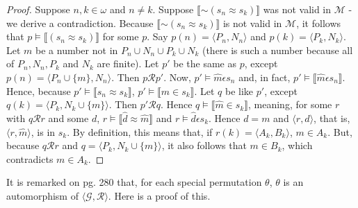 \documentclass{article}
\newcommand*{\oldneg}{\mathord{\sim}}
\newcommand{\lbc}{\llbracket}
\newcommand{\rbc}{\rrbracket}
\theoremstyle{definition}
\begin{document}
\begin{proof}
Suppose $n,k\in\omega$ and $n\ne k$. Suppose $\lbc\oldneg(s_n\approx s_k)\rbc$ was not valid in $\mathcal{M}$ - we derive a contradiction. 
Because $\lbc\oldneg(s_n\approx s_k)\rbc$ is not valid in $\mathcal{M}$, it follows that
$p\vDash\lbc(s_n\approx s_k)\rbc$ for some $p$. Say $p(n)=\langle P_n,N_n\rangle$ and 
$p(k)=\langle P_k,N_k\rangle$. Let $m$ be a number not in $P_n\cup N_n\cup P_k\cup N_k$ (there is such a number 
because all of $P_n,N_n,P_k$ and $N_k$ are finite). Let $p'$ be the same as $p$, except 
$p(n)=\langle P_n\cup\{m\},N_n\rangle$. Then $p\mathcal{R}p'$. Now, $p'\vDash\hat{m}\epsilon s_n$ and, in fact, 
$p'\vDash\lbc\hat{m}\epsilon s_n\rbc$. Hence, because $p'\vDash\lbc s_n\approx s_k\rbc$, 
$p'\vDash\lbc\hat{m}\in s_k\rbc$. Let $q$ be like $p'$, except 
$q(k)=\langle P_k,N_k\cup\{m\}\rangle$. Then $p'\mathcal{R}q$. Hence
$q\vDash\lbc\hat{m}\in s_k\rbc$, meaning, for some $r$ with $q\mathcal{R}r$ and some $d$,
$r\vDash\lbc\hat{d}\approx\hat{m}\rbc$ and $r\vDash\hat{d}\epsilon s_k$. Hence 
$d=m$ and $\langle r,\hat{d}\rangle$, that is, $\langle r,\hat{m}\rangle$, is in $s_k$. By definition, 
this means that, if $r(k)=\langle A_k,B_k\rangle$, $m\in A_k$. But, because $q\mathcal{R}r$ and
$q=\langle P_k,N_k\cup\{m\}\rangle$, it also follows that $m\in B_k$, which contradicts 
$m\in A_k$.
\end{proof}

It is remarked on pg. 280 that, for each special permutation $\theta$, $\theta$ is an automorphism of $\langle\mathcal{G},\mathcal{R}\rangle$. 
Here is a proof of this.
\end{document}
